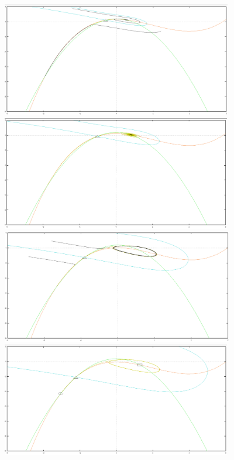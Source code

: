 \documentclass[xcolor={dvipsnames},10pt]{beamer}
\begin{document}
\begin{frame}
  {\includegraphics[height=5cm]{I_005}}
  {\includegraphics[height=5cm]{I_006}}
   {\includegraphics[height=5cm]{I_008}}
     {\includegraphics[height=5cm]{I_009}}

\end{frame}
\end{document}

